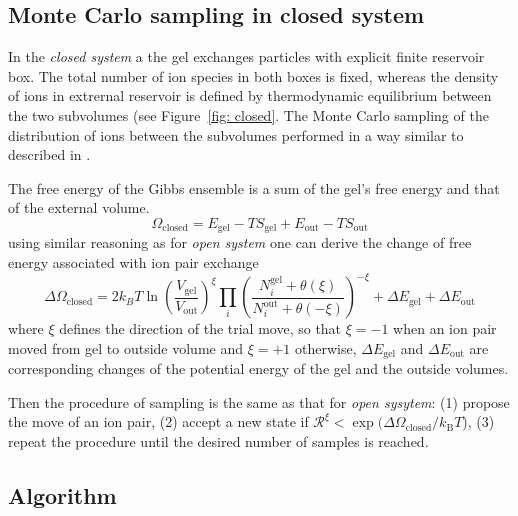 \documentclass[journal,article,submit,pdftex,moreauthors]{Definitions/mdpi}
\newcommand{\kT}{k_\mathrm{B}T}
\newcommand{\gel}{^\mathrm{gel}}
\newcommand{\out}{^{\mathrm{out}}}
\newcommand{\Vgel}{V_\mathrm{gel}}
\newcommand{\Egel}{E_\mathrm{gel}}
\newcommand{\Sgel}{S_\mathrm{gel}}
\newcommand{\Vout}{V_\mathrm{out}}
\newcommand{\Eout}{E_\mathrm{out}}
\newcommand{\Sout}{S_\mathrm{out}}
\newcommand{\reffig}[1]{Figure~\ref{#1}}
\begin{document}
\subsection{Monte Carlo sampling in closed system}

In the \emph{closed system} a the gel exchanges particles with explicit finite reservoir box. 
The total number of ion species in both boxes is fixed, whereas the density of ions in extrernal reservoir is defined by thermodynamic equilibrium between the two subvolumes (see \reffig{fig: closed}. The Monte Carlo sampling of the distribution of ions between the subvolumes performed in a way similar to described in \cite{Panagiotopoulos1988b}. 

The free energy of the Gibbs ensemble is a sum of the gel's free energy and that of the external volume.
\begin{equation}
    \Omega_{\mathrm{closed}}=\Egel-T\Sgel + \Eout-T\Sout \label{eq:Omega-GC}
\end{equation}
using similar reasoning as for \emph{open system} one can derive the change of free energy associated with ion pair exchange 
\begin{equation}
\Delta \Omega_{\mathrm{closed}} =2 k_B T \ln \left(\frac{\Vgel}{\Vout} \right) ^ {\xi}\prod_i \left(\frac{N_{i}\gel+\theta(\xi)}{N_{i}\out+\theta(-\xi)}\right)^{-\xi} + \Delta \Egel + \Delta \Eout
\end{equation}
where $\xi$ defines the direction of the trial move, so that $\xi = -1$ when an ion pair moved from gel to outside volume and  $\xi = +1$ otherwise, $\Delta \Egel$ and $\Delta \Eout$ are corresponding changes of the potential energy of the gel and the outside volumes.

Then the procedure of sampling is the same as that for \emph{open sysytem}: (1) propose the move of an ion pair, (2) accept a new state if $\mathcal{R}^{\xi}<\exp({\Delta\Omega_\mathrm{closed}/\kT}$), (3) repeat the procedure until the desired number of samples is reached.

\subsection{Algorithm}
\end{document}
